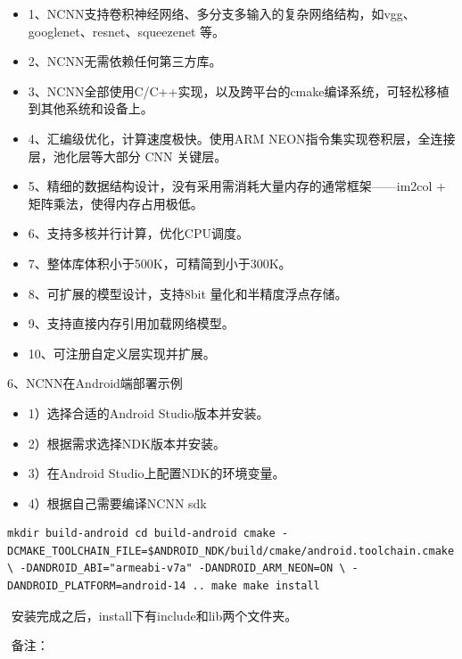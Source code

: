 \begin{itemize}
\item
  1、NCNN支持卷积神经网络、多分支多输入的复杂网络结构，如vgg、googlenet、resnet、squeezenet
  等。
\item
  2、NCNN无需依赖任何第三方库。\\
\item
  3、NCNN全部使用C/C++实现，以及跨平台的cmake编译系统，可轻松移植到其他系统和设备上。\\
\item
  4、汇编级优化，计算速度极快。使用ARM
  NEON指令集实现卷积层，全连接层，池化层等大部分 CNN 关键层。
\item
  5、精细的数据结构设计，没有采用需消耗大量内存的通常框架------im2col +
  矩阵乘法，使得内存占用极低。\\
\item
  6、支持多核并行计算，优化CPU调度。\\
\item
  7、整体库体积小于500K，可精简到小于300K。\\
\item
  8、可扩展的模型设计，支持8bit 量化和半精度浮点存储。\\
\item
  9、支持直接内存引用加载网络模型。\\
\item
  10、可注册自定义层实现并扩展。
\end{itemize}

6、NCNN在Android端部署示例

\begin{itemize}
\item
  1）选择合适的Android Studio版本并安装。
\item
  2）根据需求选择NDK版本并安装。
\item
  3）在Android Studio上配置NDK的环境变量。
\item
  4）根据自己需要编译NCNN sdk
\end{itemize}

\begin{verbatim}
mkdir build-android cd build-android cmake -DCMAKE_TOOLCHAIN_FILE=$ANDROID_NDK/build/cmake/android.toolchain.cmake \ -DANDROID_ABI="armeabi-v7a" -DANDROID_ARM_NEON=ON \ -DANDROID_PLATFORM=android-14 .. make make install
\end{verbatim}

​ 安装完成之后，install下有include和lib两个文件夹。

​ 备注：

